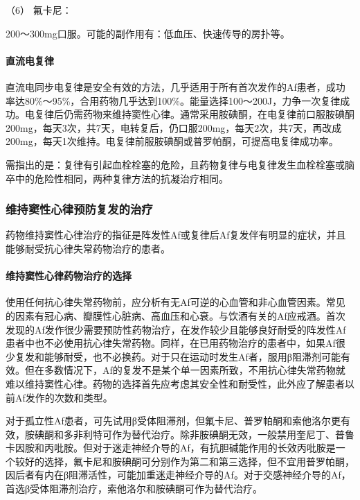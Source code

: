 \hypertarget{text00291.htmlux5cux23CHP10-2-4-3-3-3-1-6}{}
（6） 氟卡尼：

200～300mg口服。可能的副作用有：低血压、快速传导的房扑等。

\paragraph{直流电复律}

直流电同步电复律是安全有效的方法，几乎适用于所有首次发作的Af患者，成功率达80\%～95\%，合用药物几乎达到100\%。能量选择100～200J，力争一次复律成功。电复律后仍需药物来维持窦性心律。通常采用胺碘酮，在电复律前口服胺碘酮200mg，每天3次，共7天，电转复后，仍口服200mg，每天2次，共7天，再改成200mg，每天1次维持。电复律前服胺碘酮或普罗帕酮，可提高电复律成功率。

需指出的是：复律有引起血栓栓塞的危险，且药物复律与电复律发生血栓栓塞或脑卒中的危险性相同，两种复律方法的抗凝治疗相同。

\subsubsection{维持窦性心律预防复发的治疗}

药物维持窦性心律治疗的指征是阵发性Af或复律后Af复发伴有明显的症状，并且能够耐受抗心律失常药物治疗的患者。

\paragraph{维持窦性心律药物治疗的选择}

使用任何抗心律失常药物前，应分析有无Af可逆的心血管和非心血管因素。常见的因素有冠心病、瓣膜性心脏病、高血压和心衰。与饮酒有关的Af应戒酒。首次发现的Af发作很少需要预防性药物治疗，在发作较少且能够良好耐受的阵发性Af患者中也不必使用抗心律失常药物。同样，在已用药物治疗的患者中，如果Af很少复发和能够耐受，也不必换药。对于只在运动时发生Af者，服用β阻滞剂可能有效。但在多数情况下，Af的复发不是某个单一因素所致，不用抗心律失常药物就难以维持窦性心律。药物的选择首先应考虑其安全性和耐受性，此外应了解患者以前Af发作的次数和类型。

对于孤立性Af患者，可先试用β受体阻滞剂，但氟卡尼、普罗帕酮和索他洛尔更有效，胺碘酮和多非利特可作为替代治疗。除非胺碘酮无效，一般禁用奎尼丁、普鲁卡因胺和丙吡胺。但对于迷走神经介导的Af，有抗胆碱能作用的长效丙吡胺是一个较好的选择，氟卡尼和胺碘酮可分别作为第二和第三选择，但不宜用普罗帕酮，因后者有内在β阻滞活性，可能加重迷走神经介导的Af。对于交感神经介导的Af，首选β受体阻滞剂治疗，索他洛尔和胺碘酮可作为替代治疗。

